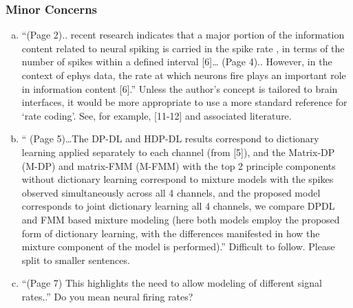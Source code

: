 


\subsubsection{Minor Concerns} %
\label{ssub:minor_concerns}



\begin{enumerate}[a.]
	\item “(Page 2).. recent research indicates that a major portion of the information content related to neural spiking is carried in the spike rate , in terms of the number of spikes within a defined interval [6]… (Page 4).. However, in the context of ephys data, the rate at which neurons fire plays an important role in information content [6].”
	Unless the author’s concept is tailored to brain interfaces, it would be more appropriate to use a more standard reference for ‘rate coding’. See, for example, [11-12] and associated literature.
	
	\item “ (Page 5)…The DP-DL and HDP-DL results correspond to dictionary learning applied separately to each channel (from [5]), and the Matrix-DP (M-DP) and matrix-FMM (M-FMM) with the top 2 principle components without dictionary learning correspond to mixture models with the spikes observed simultaneously across all 4 channels, and the proposed model corresponds to joint dictionary learning all 4 channels, we compare DPDL and FMM based mixture modeling (here both models employ the proposed form of dictionary learning, with the differences manifested in how the mixture component of the model is performed).”
	Difficult to follow. Please split to smaller sentences.
	
	\item “(Page 7) This highlights the need to allow modeling of different signal rates..”
	Do you mean neural firing rates?
\end{enumerate}











% 







